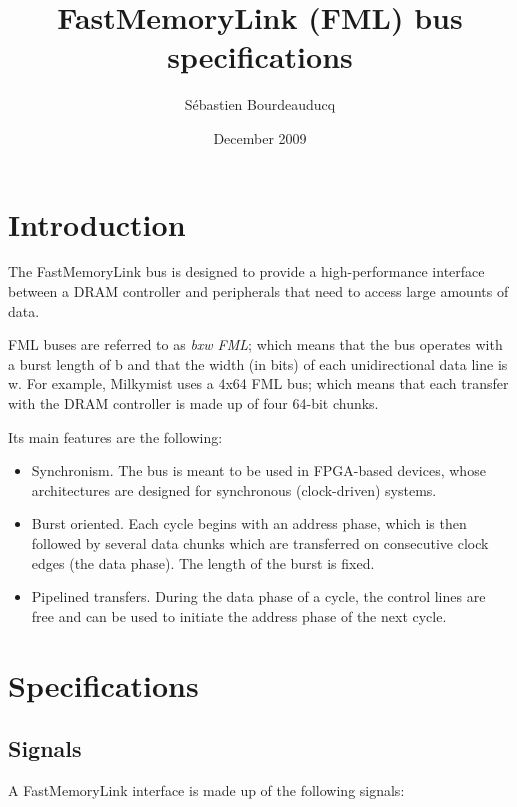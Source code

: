 \documentclass[a4paper,11pt]{article}
\title{FastMemoryLink (FML) bus specifications}
\author{S\'ebastien Bourdeauducq}
\date{December 2009}
\begin{document}
\setlength{\parindent}{0pt}
\setlength{\parskip}{5pt}
\maketitle{}

\section{Introduction}
The FastMemoryLink bus is designed to provide a high-performance interface between a DRAM controller and peripherals that need to access large amounts of data.

FML buses are referred to as \textit{bxw FML}; which means that the bus operates with a burst length of b and that the width (in bits) of each unidirectional data line is w. For example, Milkymist uses a 4x64 FML bus; which means that each transfer with the DRAM controller is made up of four 64-bit chunks.

Its main features are the following:
\begin{itemize}
\item Synchronism. The bus is meant to be used in FPGA-based devices, whose architectures are designed for synchronous (clock-driven) systems.
\item Burst oriented. Each cycle begins with an address phase, which is then followed by several data chunks  which are transferred on consecutive clock edges (the data phase). The length of the burst is fixed.
\item Pipelined transfers. During the data phase of a cycle, the control lines are free and can be used to initiate the address phase of the next cycle.
\end{itemize}

\section{Specifications}
\subsection{Signals}
A FastMemoryLink interface is made up of the following signals:
\end{document}
